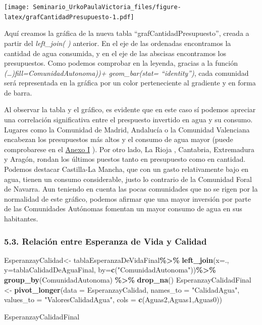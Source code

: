 \documentclass[
]{article}
\newenvironment{Shaded}{\begin{snugshade}}{\end{snugshade}}
\newcommand{\AttributeTok}[1]{\textcolor[rgb]{0.13,0.29,0.53}{#1}}
\newcommand{\FunctionTok}[1]{\textcolor[rgb]{0.13,0.29,0.53}{\textbf{#1}}}
\newcommand{\NormalTok}[1]{#1}
\newcommand{\OtherTok}[1]{\textcolor[rgb]{0.56,0.35,0.01}{#1}}
\newcommand{\SpecialCharTok}[1]{\textcolor[rgb]{0.81,0.36,0.00}{\textbf{#1}}}
\newcommand{\StringTok}[1]{\textcolor[rgb]{0.31,0.60,0.02}{#1}}
\begin{document}
\texttt{[image: Seminario\_UrkoPaulaVictoria\_files/figure-latex/grafCantidadPresupuesto-1.pdf]}

Aquí creamos la gráfica de la nueva tabla ``grafCantidadPresupuesto'',
creada a partir del \emph{left\_join( )} anterior. En el eje de las
ordenadas encontramos la cantidad de agua consumida, y en el eje de las
abscisas encontramos los presupuestos. Como podemos comprobar en la
leyenda, gracias a la función \emph{(\ldots)fill=ComunidadAutonoma))+
geom\_bar(stat= ``identity'')}, cada comunidad será representada en la
gráfica por un color perteneciente al gradiente y en forma de barra.

Al observar la tabla y el gráfico, es evidente que en este caso sí
podemos apreciar una correlación significativa entre el prespuesto
invertido en agua y su consumo. Lugares como la Comunidad de Madrid,
Andalucía o la Comunidad Valenciana encabezan los presupuestos más altos
y el consumo de agua mayor (puede comprobarese en el
\protect\hyperlink{CantidadPresupuesto}{Anexo I} ). Por otro lado, La
Rioja , Cantabria, Extremadura y Aragón, rondan los últimos puestos
tanto en presupuesto como en cantidad. Podemos destacar Castilla-La
Mancha, que con un gasto relativamente bajo en agua, tienen un consumo
considerable, justo lo contrario de la Comunidad Foral de Navarra. Aun
teniendo en cuenta las pocas comunidades que no se rigen por la
normalidad de este gráfico, podemos afirmar que una mayor inversión por
parte de las Comunidades Autónomas fomentan un mayor consumo de agua en
sus habitantes.

\hypertarget{relaciuxf3n-entre-esperanza-de-vida-y-calidad}{%
\subsubsection{5.3. Relación entre Esperanza de Vida y
Calidad}\label{relaciuxf3n-entre-esperanza-de-vida-y-calidad}}

\begin{Shaded}
\begin{Highlighting}[]
\NormalTok{EsperanzayCalidad}\OtherTok{\textless{}{-}}\NormalTok{ tablaEsperanzaDeVidaFinal}\SpecialCharTok{\%\textgreater{}\%}
  \FunctionTok{left\_join}\NormalTok{(}\AttributeTok{x=}\NormalTok{., }\AttributeTok{y=}\NormalTok{tablaCalidadDeAguaFinal, }\AttributeTok{by=}\FunctionTok{c}\NormalTok{(}\StringTok{"ComunidadAutonoma"}\NormalTok{))}\SpecialCharTok{\%\textgreater{}\%}
  \FunctionTok{group\_by}\NormalTok{(ComunidadAutonoma) }\SpecialCharTok{\%\textgreater{}\%}
  \FunctionTok{drop\_na}\NormalTok{()}
\NormalTok{EsperanzayCalidadFinal }\OtherTok{\textless{}{-}} \FunctionTok{pivot\_longer}\NormalTok{(}\AttributeTok{data =}\NormalTok{ EsperanzayCalidad, }\AttributeTok{names\_to =} \StringTok{"CalidadAgua"}\NormalTok{, }\AttributeTok{values\_to =} \StringTok{"ValoresCalidadAgua"}\NormalTok{, }\AttributeTok{cols =} \FunctionTok{c}\NormalTok{(Aguas2,Aguas1,Aguas0))}

\NormalTok{EsperanzayCalidadFinal}
\end{Highlighting}
\end{Shaded}
\end{document}
